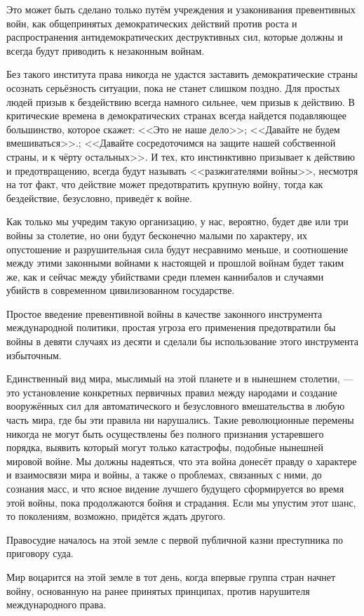 Это может быть сделано только путём учреждения и узаконивания превентивных войн, как общепринятых демократических действий против роста и распространения антидемократических деструктивных сил, которые должны и всегда будут приводить к незаконным войнам.

Без такого института права никогда не удастся заставить демократические страны осознать серьёзность ситуации, пока не станет слишком поздно. Для простых людей призыв к бездействию всегда намного сильнее, чем призыв к действию. В критические времена в демократических странах всегда найдется подавляющее большинство, которое скажет: <<Это не наше дело>>; <<Давайте не будем вмешиваться>>.; <<Давайте сосредоточимся на защите нашей собственной страны, и к чёрту остальных>>. И тех, кто инстинктивно призывает к действию и предотвращению, всегда будут называть <<разжигателями войны>>, несмотря на тот факт, что действие может предотвратить крупную войну, тогда как бездействие, безусловно, приведёт к войне.

Как только мы учредим такую организацию, у нас, вероятно, будет две или три войны за столетие, но они будут бесконечно малыми по характеру, их опустошение и разрушительная сила будут несравнимо меньше, и соотношение между этими законными войнами к настоящей и прошлой войнам будет таким же, как и сейчас между убийствами среди племен каннибалов и случаями убийств в современном цивилизованном государстве.

Простое введение превентивной войны в качестве законного инструмента международной политики, простая угроза его применения предотвратили бы войны в девяти случаях из десяти и сделали бы использование этого инструмента избыточным.

Единственный вид мира, мыслимый на этой планете и в нынешнем столетии, — это установление конкретных первичных правил между народами и создание вооружённых сил для автоматического и безусловного вмешательства в любую часть мира, где бы эти правила ни нарушались. Такие революционные перемены никогда не могут быть осуществлены без полного признания устаревшего порядка, выявить который могут только катастрофы, подобные нынешней мировой войне. Мы должны надеяться, что эта война донесёт правду о характере и взаимосвязи мира и войны, а также о проблемах, связанных с ними, до сознания масс, и что ясное видение лучшего будущего сформируется во время этой войны, пока продолжаются бойня и страдания. Если мы упустим этот шанс, то поколениям, возможно, придётся ждать другого.

Правосудие началось на этой земле с первой публичной казни преступника по приговору суда.

Мир воцарится на этой земле в тот день, когда впервые группа стран начнет войну, основанную на ранее принятых принципах, против нарушителя международного права.
